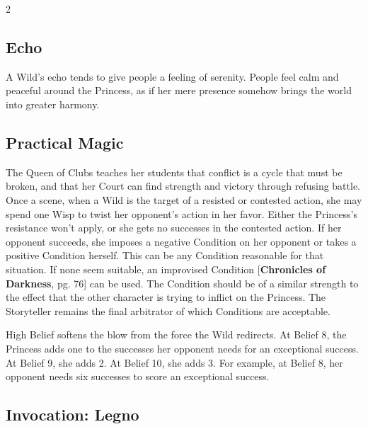 \begin{multicols}{2}
\subsection*{Echo}

A Wild's echo tends to give people a feeling of serenity. People feel calm and peaceful around the Princess, as if her mere presence somehow brings the world into greater harmony.

\subsection*{Practical Magic}

The Queen of Clubs teaches her students that conflict is a cycle that must be broken, and that her Court can find strength and victory through refusing battle. Once a scene, when a Wild is the target of a resisted or contested action, she may spend one Wisp to twist her opponent’s action in her favor. Either the Princess's resistance won't apply, or she gets no successes in the contested action. If her opponent succeeds, she imposes a negative Condition on her opponent or takes a positive Condition herself. This can be any Condition reasonable for that situation. If none seem suitable, an improvised Condition [\textbf{Chronicles of Darkness}, pg. 76] can be used. The Condition should be of a similar strength to the effect that the other character is trying to inflict on the Princess. The Storyteller remains the final arbitrator of which Conditions are acceptable.

High Belief softens the blow from the force the Wild redirects. At Belief 8, the Princess adds one to the successes her opponent needs for an exceptional success. At Belief 9, she adds 2. At Belief 10, she adds 3. For example, at Belief 8, her opponent needs six successes to score an exceptional success. 

\subsection*{Invocation: Legno}


\end{multicols}
